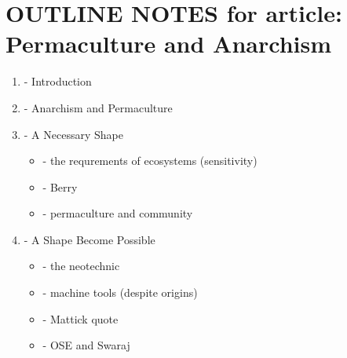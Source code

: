 \documentclass[a4paper, 11pt]{article}
\begin{document}
\section{OUTLINE NOTES for article: Permaculture and Anarchism}
\begin{enumerate}
    \item - Introduction
    \item - Anarchism and Permaculture
    \item - A Necessary Shape
        \begin{itemize}
            \item - the requrements of ecosystems (sensitivity)
            \item - Berry
            \item - permaculture and community
        \end{itemize}
    \item - A Shape Become Possible
        \begin{itemize}
            \item - the neotechnic
            \item - machine tools (despite origins)
            \item - Mattick quote
            \item - OSE and Swaraj
        \end{itemize}
\end{enumerate}
\end{document}
